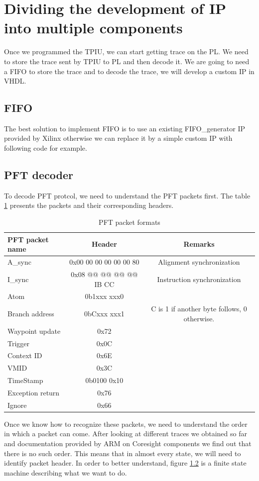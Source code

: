 \documentclass[10pt,a4paper, oneside]{memoir}
\begin{document}
\section{Dividing the development of IP into multiple components}
Once we programmed the TPIU, we can start getting trace on the PL. We need to store the trace sent by TPIU to PL and then decode it. We are going to need a FIFO to store the trace and to decode the trace, we will develop a custom IP in VHDL. 

\subsection{FIFO}
The best solution to implement FIFO is to use an existing FIFO\_generator IP provided by Xilinx otherwise we can replace it by a simple custom IP with following code for example. 

\subsection{PFT decoder}
To decode PFT protcol, we need to understand the PFT packets first. The table \ref{tab:pft-packets} presents the packets and their corresponding headers.

\begin{table}
\begin{tabular}{l|c|c}
\toprule
\textbf{PFT packet name} & \textbf{Header} & \textbf{Remarks}\\
\midrule
A\_sync & 0x00 00 00 00 00 00 80 & Alignment synchronization\\
I\_sync & 0x08 @@ @@ @@ @@ IB CC & Instruction synchronization\\
Atom & 0b1xxx xxx0 & \\
Branch address & 0bCxxx xxx1 & C is 1 if another byte follows, 0 otherwise.\\
Waypoint update & 0x72 & \\
Trigger & 0x0C & \\
Context ID & 0x6E & \\
VMID & 0x3C & \\
TimeStamp & 0b0100 0x10 & \\
Exception return & 0x76 & \\
Ignore & 0x66 & \\
\bottomrule
\end{tabular}
\caption{PFT packet formats}
\label{tab:pft-packets}
\end{table}

Once we know how to recognize these packets, we need to understand the order in which a packet can come. After looking at different traces we obtained so far and documentation provided by ARM on Coresight components we find out that there is no such order. This means that in almost every state, we will need to identify packet header. In order to better understand, figure \ref{} is a finite state machine describing what we want to do.
\end{document}
